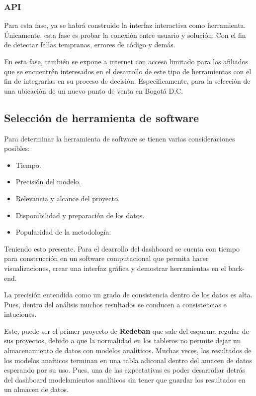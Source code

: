 \documentclass[a4paper]{article}
\begin{document}
\subsubsection{API}

Para esta fase, ya se habrá construido la interfaz interactiva como herramienta. Únicamente, esta fase es probar la conexión entre usuario y solución. Con el fin de detectar fallas tempranas, errores de código y demás.

En esta fase, también se expone a internet con acceso limitado para los afiliados que se encuentrén interesados en el desarrollo de este tipo de herramientas con el fin de integrarlas en  su proceso de decisión. Especificamente, para la selección de una ubicación de un nuevo punto de venta en Bogotá D.C.

\subsection{Selección de herramienta de software}

Para determinar la herramienta de software se tienen varias consideraciones posibles:

\begin{itemize}
	\item Tiempo.
	\item Precisión del modelo.
	\item Relevancia y alcance del proyecto.
	\item Disponibilidad y preparación de los datos.
	\item Popularidad de la metodología.
\end{itemize}

Teniendo esto presente. Para el dearrollo del dashboard se cuenta con tiempo para construcción en un software computacional que permita hacer visualizaciones, crear una interfaz gráfica y demostrar herramientas en el back-end.

La precisión entendida como un grado de consistencia dentro de los datos es alta. Pues, dentro del análisis muchos resultados se conducen a consistencias e intuciones.

Este, puede ser el primer proyecto de \textbf{Redeban} que sale del esquema regular de sus proyectos, debido a que la normalidad en los tableros no permite dejar un almacenamiento de datos con modelos analíticos. Muchas veces, los resultados de los modelos anaíticos terminan en una tabla adiconal dentro del amacen de datos esperando por su uso. Pues, una de las expectativas es poder desarrollar detrás del dashboard modelamientos analíticos sin tener que guardar los resultados en un almacen de datos.
\end{document}

